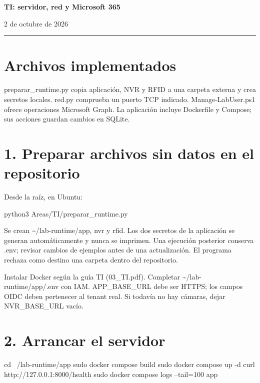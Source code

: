 \documentclass[12pt,a4paper]{article}
\begin{document}
{\LARGE\bfseries TI: servidor, red y Microsoft 365\par}\vspace{6pt}
2 de octubre de 2026\par\hrule\vspace{10pt}
\section*{Archivos implementados}
\textnormal{preparar\_\allowbreak{}runtime.py} copia aplicación, NVR y RFID a una carpeta externa y crea secretos locales. \textnormal{red.py} comprueba un puerto TCP indicado. \textnormal{Manage-LabUser.ps1} ofrece operaciones Microsoft Graph. La aplicación incluye Dockerfile y Compose; sus acciones guardan cambios en SQLite.\par
{}\section*{1. Preparar archivos sin datos en el repositorio}
Desde la raíz, en Ubuntu:\par
{}
\begin{Comandos}
python3 Areas/TI/preparar_runtime.py
\end{Comandos}
Se crean \textnormal{\textasciitilde{}/\allowbreak{}lab-runtime/\allowbreak{}app}, \textnormal{nvr} y \textnormal{rfid}. Los dos secretos de la aplicación se generan automáticamente y nunca se imprimen. Una ejecución posterior conserva \textnormal{.env}; revisar cambios de ejemplos antes de una actualización. El programa rechaza como destino una carpeta dentro del repositorio.\par
Instalar Docker según la guía TI (03\_TI.pdf). Completar \textnormal{\textasciitilde{}/\allowbreak{}lab-runtime/\allowbreak{}app/\allowbreak{}.env} con IAM. APP\_BASE\_URL debe ser HTTPS; los campos OIDC deben pertenecer al tenant real. Si todavía no hay cámaras, dejar NVR\_BASE\_URL vacío.\par
{}\section*{2. Arrancar el servidor}
\begin{Comandos}
cd ~/lab-runtime/app
sudo docker compose build
sudo docker compose up -d
curl http://127.0.0.1:8000/health
sudo docker compose logs --tail=100 app
\end{Comandos}
\end{document}
